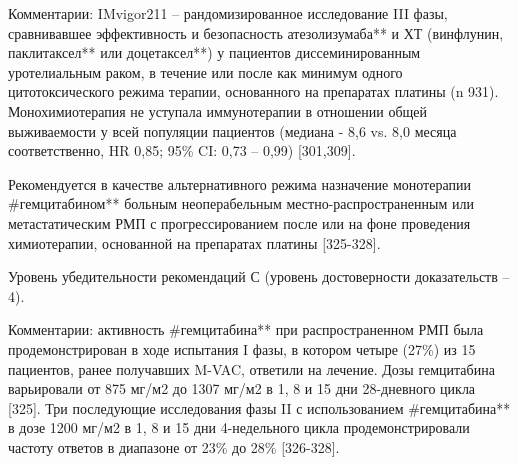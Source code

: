 Комментарии: IMvigor211 – рандомизированное исследование III фазы, сравнивавшее эффективность и безопасность атезолизумаба** и ХТ (винфлунин, паклитаксел** или доцетаксел**) у пациентов диссеминированным уротелиальным раком, в течение или после как минимум одного цитотоксического режима терапии, основанного на препаратах платины (n 931). Монохимиотерапия не уступала иммунотерапии в отношении общей выживаемости у всей популяции пациентов (медиана - 8,6 vs. 8,0 месяца соответственно, HR 0,85; 95\% CI: 0,73 – 0,99) [301,309].

Рекомендуется в качестве альтернативного режима назначение монотерапии #гемцитабином** больным неоперабельным местно-распространенным или метастатическим РМП с прогрессированием после или на фоне проведения химиотерапии, основанной на препаратах платины [325-328].

Уровень убедительности рекомендаций С (уровень достоверности доказательств – 4).

Комментарии: активность #гемцитабина** при распространенном РМП была продемонстрирован в ходе испытания I фазы, в котором четыре (27\%) из 15 пациентов, ранее получавших M-VAC, ответили на лечение. Дозы гемцитабина варьировали от 875 мг/м2 до 1307 мг/м2 в 1, 8 и 15 дни 28-дневного цикла [325]. Три последующие исследования фазы II с использованием #гемцитабина** в дозе 1200 мг/м2 в 1, 8 и 15 дни 4-недельного цикла продемонстрировали частоту ответов в диапазоне от 23\% до 28\% [326-328].


